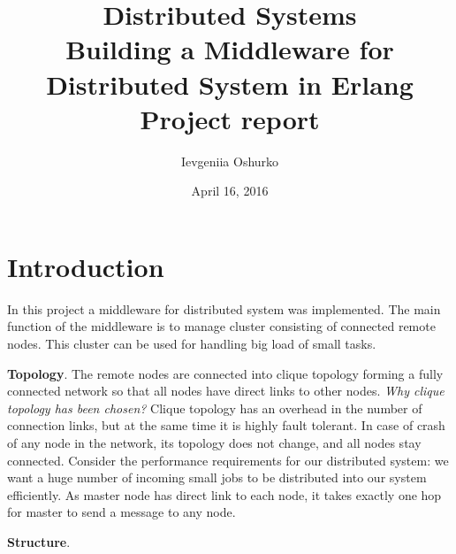 \documentclass[12pt]{article}
\newcommand\MyFive[2]{%
  \foreach \x in {1,...,5}{
    \pgfmathparse{(\x-1)*72+floor(\x/6)*36 + 90 - 90*#2}
    \node[draw,circle,inner sep=5pt,text width=1cm, align=center] (#1-\x) at (\pgfmathresult:2.5cm){ \ifthenelse{1 = \x}{Master Node}{Node $\x$}};
  }
  \foreach \x [count=\xi from 1] in {1,...,5}{
    \foreach \y in {\x,...,5}{
    \path (#1-\xi) edge[-] (#1-\y);
  }
}
}
\begin{document}
\title{
Distributed Systems \\
\textbf{Building a Middleware for Distributed System in Erlang}\\
Project report
}

\author{Ievgeniia Oshurko}
\date{April 16, 2016}
\maketitle


\section{Introduction}

In this project a middleware for distributed system was implemented. The main function of the middleware is to manage cluster consisting of connected remote nodes. This cluster can be used for handling big load of small tasks. 

\textbf{Topology}. The remote nodes are connected into clique topology forming a fully connected network so that all nodes have direct links to other nodes. \emph{Why clique topology has been chosen?} Clique topology has an overhead in the number of  connection links, but at the same time it is highly fault tolerant. In case of crash of any node in the network, its topology does not change, and all nodes stay connected. Consider the performance requirements for our distributed system: we want a huge number of incoming small jobs to be distributed into our system efficiently. As master node has direct link to each node, it takes exactly one hop for master to send a message to any node. 

\begin{center}
	
	
\end{center}
\textbf{Structure}.
\end{document}
